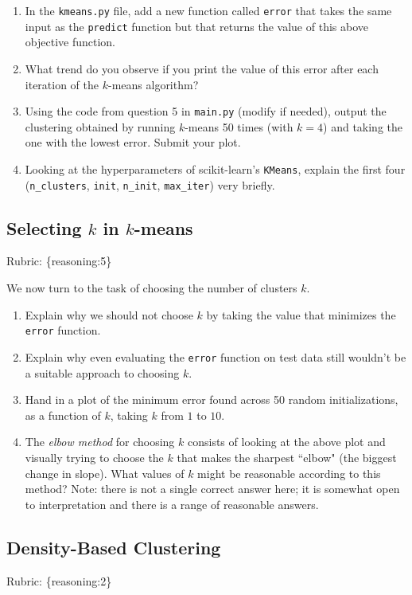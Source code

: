 \documentclass{article}
\def\rubric#1{\gre{Rubric: \{#1\}}}{}
\def\blu#1{{\color{blu}#1}}
\def\gre#1{{\color{gre}#1}}
\def\enum#1{\begin{enumerate}#1\end{enumerate}}
\begin{document}
 \blu{\enum{
 \item In the \texttt{kmeans.py} file, add a new function called \texttt{error} that takes the same input as the \texttt{predict} function but that returns the value of this above objective function. 
 \item What trend do you observe if you print the value of this error after each iteration of the $k$-means algorithm?
 \item Using the code from question 5 in \texttt{main.py} (modify if needed), output the clustering obtained by running $k$-means 50 times (with $k=4$) and taking the one with the lowest error. Submit your plot.
 \item Looking at the hyperparameters of scikit-learn's \texttt{KMeans}, explain the first four (\texttt{n\_clusters}, \texttt{init}, \texttt{n\_init}, \texttt{max\_iter}) very briefly.
 }}


 \subsection{Selecting $k$ in $k$-means}
\rubric{reasoning:5}

 We now turn to the task of choosing the number of clusters $k$.

 \blu{\enum{
 \item Explain why we should not choose $k$ by taking the value that minimizes the \texttt{error} function.
 \item Explain why even evaluating the \texttt{error} function on test data still wouldn't be a suitable approach to choosing $k$.
 \item Hand in a plot of the minimum error found across 50 random initializations, as a function of $k$, taking $k$ from $1$ to $10$.
 \item The \emph{elbow method} for choosing $k$ consists of looking at the above plot and visually trying to choose the $k$ that makes the sharpest ``elbow" (the biggest change in slope). What values of $k$ might be reasonable according to this method? Note: there is not a single correct answer here; it is somewhat open to interpretation and there is a range of reasonable answers.
 }}

\subsection{Density-Based Clustering}
\rubric{reasoning:2}
\end{document}
